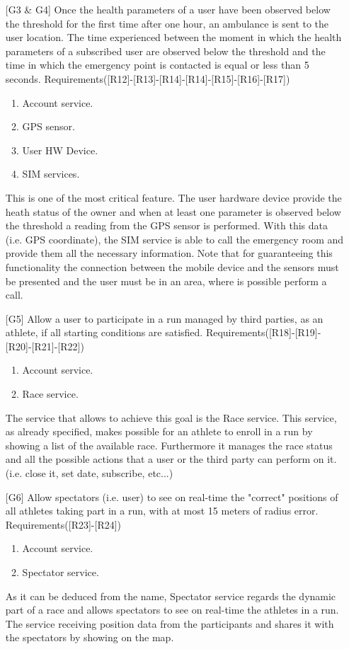 \begin{itemize}
\item[{[G3 \& G4]}] Once the health parameters of a user have been observed below the threshold for the first time after one hour, an ambulance is sent to the user location. 
The time experienced between the moment in which the health parameters of a subscribed user are observed below the threshold and the time in which the emergency point is contacted is equal or less than 5 seconds. Requirements([R12]-[R13]-[R14]-[R14]-[R15]-[R16]-[R17])
	\begin{enumerate}
	\item Account service.
	\item GPS sensor.
	\item User HW Device.
	\item SIM services.
	\end{enumerate}
This is one of the most critical feature. The user hardware device provide the heath status of the owner and when at least one parameter is observed below the threshold a reading from the GPS sensor is performed. With this data (i.e. GPS coordinate), the SIM service is able to call the emergency room and provide them all the necessary information. Note that for guaranteeing this functionality the connection between the mobile device and the sensors must be presented and the user must be in an area, where is possible perform a call.

\item[{[G5]}] Allow a user to participate in a run managed by third parties, as an athlete, if all starting conditions are satisfied. Requirements([R18]-[R19]-[R20]-[R21]-[R22])
	\begin{enumerate}
	\item Account service.
	\item Race service.
	\end{enumerate}
The service that allows to achieve this goal is the Race service. This service, as already specified, makes possible for an athlete to enroll in a run by showing a list of the available race. Furthermore it manages the race status and all the possible actions that a user or the third party can perform on it. (i.e. close it, set date, subscribe, etc...) 

\item[{[G6]}] Allow spectators (i.e. user) to see on real-time the "correct" positions of all athletes taking part in a run, with at most 15 meters of radius error.
Requirements([R23]-[R24])
	\begin{enumerate}
	\item Account service.
	\item Spectator service.
	\end{enumerate}
As it can be deduced from the name, Spectator service regards the dynamic part of a race and allows spectators to see on real-time the athletes in a run. The service receiving position data from the participants and shares it with the spectators by showing on the map. 
	

\end{itemize}
